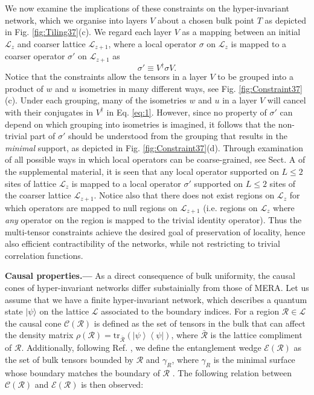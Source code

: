 \documentclass[aps,prl,twocolumn,showpacs,superscriptaddress,floatfix,10pt]{revtex4-1}
\newcommand{\ket}[1]{\mbox{$| #1 \rangle$}}
\def\E{{\mathcal E}}
\def\L{{\mathcal L}}
\def\C{{\mathcal C}}
\def\R{{\mathcal R}}
\begin{document}
We now examine the implications of these constraints on the hyper-invariant network, which we organise into layers $V$ about a chosen bulk point $T$ as depicted in Fig. \ref{fig:Tiling37}(c). We regard each layer $V$ as a mapping between an initial $\L_z$ and coarser lattice $\L_{z+1}$, where a local operator $\sigma$ on $\L_z$ is mapped to a coarser operator $\sigma'$ on $\L_{z+1}$ as
\begin{equation}
\sigma' \equiv {V^\dag }\sigma V. \label{eq:1}
\end{equation}
Notice that the constraints allow the tensors in a layer $V$ to be grouped into a product of $w$ and $u$ isometries in many different ways, see Fig. \ref{fig:Constraint37}(c). Under each grouping, many of the isometries $w$ and $u$ in a layer $V$ will cancel with their conjugates in $V^\dag$ in Eq. \ref{eq:1}. However, since no property of $\sigma'$ can depend on which grouping into isometries is imagined, it follows that the non-trivial part of $\sigma'$ should be understood from the grouping that results in the \emph{minimal} support, as depicted in Fig. \ref{fig:Constraint37}(d). Through examination of all possible ways in which local operators can be coarse-grained, see Sect. A of the supplemental material, it is seen that any local operator supported on $L\le 2$ sites of lattice $\L_z$ is mapped to a local operator $\sigma'$ supported on $L\le 2$ sites of the coarser lattice $\L_{z+1}$. Notice also that there does not exist regions on $\L_z$ for which operators are mapped to null regions on $\L_{z+1}$ (i.e. regions on $\L_z$ where \emph{any} operator on the region is mapped to the trivial identity operator). Thus the multi-tensor constraints achieve the desired goal of preservation of locality, hence also efficient contractibility of the networks, while not restricting to trivial correlation functions.

\textbf{Causal properties.---} As a direct consequence of bulk uniformity, the causal cones of hyper-invariant networks differ substainially from those of MERA. Let us assume that we have a finite hyper-invariant network, which describes a quantum state $\ket{\psi}$ on the lattice $\L$ associated to the boundary indices. For a region $\R \in \L$ the causal cone $\C(\R)$ is defined as the set of tensors in the bulk that can affect the density matrix $\rho(\R) = \textrm{tr}_{\bar{\R}}\left( \left| \psi  \right\rangle \left\langle \psi  \right| \right)$, where $\bar{\R}$ is the lattice compliment of $\R$. Additionally, following Ref. \cite{Pasta15}, we define the entanglement wedge $\E(\R)$ as the set of bulk tensors bounded by $\R$ and $\gamma_R$, where $\gamma_R$ is the minimal surface whose boundary matches the boundary of $\R$ \cite{geodesic}. The following relation between $\C(\R)$ and $\E(\R)$ is then observed:
\newline
\end{document}
